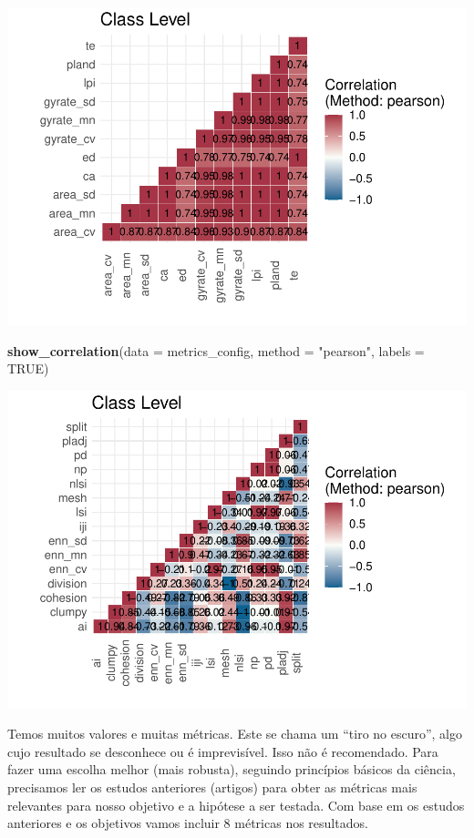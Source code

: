 \documentclass[
]{article}
\newenvironment{Shaded}{\begin{snugshade}}{\end{snugshade}}
\newcommand{\AttributeTok}[1]{\textcolor[rgb]{0.13,0.29,0.53}{#1}}
\newcommand{\ConstantTok}[1]{\textcolor[rgb]{0.56,0.35,0.01}{#1}}
\newcommand{\FunctionTok}[1]{\textcolor[rgb]{0.13,0.29,0.53}{\textbf{#1}}}
\newcommand{\NormalTok}[1]{#1}
\newcommand{\StringTok}[1]{\textcolor[rgb]{0.31,0.60,0.02}{#1}}
\begin{document}
\includegraphics{epr_files/figure-latex/unnamed-chunk-63-1.pdf}

\begin{Shaded}
\begin{Highlighting}[]
\FunctionTok{show\_correlation}\NormalTok{(}\AttributeTok{data =}\NormalTok{ metrics\_config, }\AttributeTok{method =} \StringTok{"pearson"}\NormalTok{, }\AttributeTok{labels =} \ConstantTok{TRUE}\NormalTok{)}
\end{Highlighting}
\end{Shaded}

\includegraphics{epr_files/figure-latex/unnamed-chunk-63-2.pdf}

Temos muitos valores e muitas métricas.
Este se chama um ``tiro no escuro'', algo cujo resultado se desconhece
ou é imprevisível. Isso não é recomendado.
Para fazer uma escolha melhor (mais robusta), seguindo princípios
básicos da ciência, precisamos ler os estudos anteriores
(artigos) para obter as métricas mais relevantes para nosso objetivo e
a hipótese a ser testada. Com base em os estudos anteriores e os
objetivos vamos incluir 8 métricas nos resultados.
\end{document}

